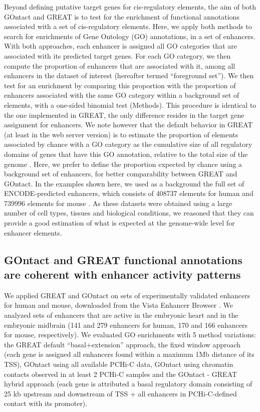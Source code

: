 Beyond defining putative target genes for \gls{cis}-regulatory elements, the aim of both GOntact and GREAT is to test for the enrichment of functional annotations associated with a set of \gls{cis}-regulatory elements. Here, we apply both methods to search for enrichments of Gene Ontology (GO) annotations, in a set of enhancers. With both approaches, each enhancer is assigned all GO categories that are associated with its predicted target genes. For each GO category, we then compute the proportion of enhancers that are associated with it, among all enhancers in the dataset of interest (hereafter termed “foreground set”). We then test for an enrichment by comparing this proportion with the proportion of enhancers associated with the same GO category within a background set of elements, with a one-sided binomial test (Methods). This procedure is identical to the one implemented in GREAT, the only difference resides in the target gene assignment for enhancers. We note however that the default behavior in GREAT (at least in the web server version) is to estimate the proportion of elements associated by chance with a GO category as the cumulative size of all regulatory domains of genes that have this GO annotation, relative to the total size of the genome \citep{mclean_great_2010}. Here, we prefer to define the proportion expected by chance using a background set of enhancers, for better comparability between GREAT and GOntact. In the examples shown here, we used as a background the full set of ENCODE-predicted enhancers, which consists of 408737 elements for human and 739996 elements for mouse \citep{davis_encyclopedia_2018,laverre_long-range_2022}. As these datasets were obtained using a large number of cell types, tissues and biological conditions, we reasoned that they can provide a good estimation of what is expected at the genome-wide level for enhancer elements. 

\subsection{GOntact and GREAT functional annotations are coherent with enhancer activity patterns}

We applied GREAT and GOntact on sets of experimentally validated enhancers for human and mouse, downloaded from the Vista Enhancer Browser \citep{visel_vista_2007}. We analyzed sets of enhancers that are active in the embryonic heart and in the embryonic midbrain (141 and 279 enhancers for human, 170 and 166 enhancers for mouse, respectively). We evaluated GO enrichments with 5 method variations: the GREAT default “basal+extension” approach, the fixed window approach (each gene is assigned all enhancers found within a maximum 1Mb distance of its TSS), GOntact using all available PCHi-C data, GOntact using chromatin contacts observed in at least 2 PCHi-C samples and the GOntact - GREAT hybrid approach (each gene is attributed a basal regulatory domain consisting of 25 kb upstream and downstream of TSS + all enhancers in PCHi-C-defined contact with its promoter). \\

